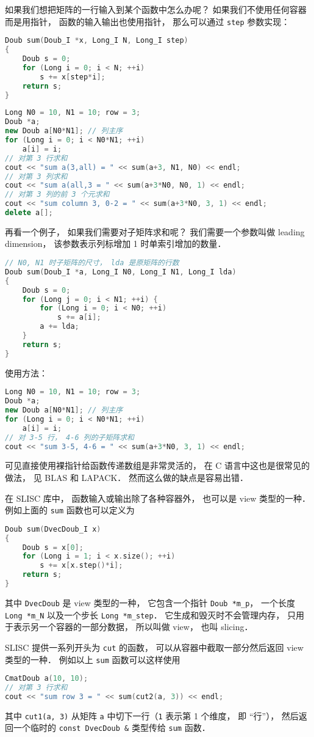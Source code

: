 

如果我们想把矩阵的一行输入到某个函数中怎么办呢？ 如果我们不使用任何容器而是用指针， 函数的输入输出也使用指针， 那么可以通过 \verb|step| 参数实现：
\begin{lstlisting}[language=cpp]
Doub sum(Doub_I *x, Long_I N, Long_I step)
{
    Doub s = 0;
    for (Long i = 0; i < N; ++i)
        s += x[step*i];
    return s;
}
\end{lstlisting}

\begin{lstlisting}[language=cpp]
Long N0 = 10, N1 = 10; row = 3;
Doub *a;
new Doub a[N0*N1]; // 列主序
for (Long i = 0; i < N0*N1; ++i)
    a[i] = i;
// 对第 3 行求和
cout << "sum a(3,all) = " << sum(a+3, N1, N0) << endl;
// 对第 3 列求和
cout << "sum a(all,3 = " << sum(a+3*N0, N0, 1) << endl;
// 对第 3 列的前 3 个元求和
cout << "sum column 3, 0-2 = " << sum(a+3*N0, 3, 1) << endl;
delete a[];
\end{lstlisting}
再看一个例子， 如果我们需要对子矩阵求和呢？ 我们需要一个参数叫做 leading dimension， 该参数表示列标增加 1 时单索引增加的数量．
\begin{lstlisting}[language=cpp]
// N0, N1 时子矩阵的尺寸， lda 是原矩阵的行数
Doub sum(Doub_I *a, Long_I N0, Long_I N1, Long_I lda)
{
    Doub s = 0;
    for (Long j = 0; i < N1; ++i) {
        for (Long i = 0; i < N0; ++i)
            s += a[i];
        a += lda;
    }
    return s;
}
\end{lstlisting}
使用方法：
\begin{lstlisting}[language=cpp]
Long N0 = 10, N1 = 10; row = 3;
Doub *a;
new Doub a[N0*N1]; // 列主序
for (Long i = 0; i < N0*N1; ++i)
    a[i] = i;
// 对 3-5 行， 4-6 列的子矩阵求和
cout << "sum 3-5, 4-6 = " << sum(a+3*N0, 3, 1) << endl;
\end{lstlisting}

可见直接使用裸指针给函数传递数组是非常灵活的， 在 C 语言中这也是很常见的做法， 见 BLAS 和 LAPACK． 然而这么做的缺点是容易出错．

在 SLISC 库中， 函数输入或输出除了各种容器外， 也可以是 view 类型的一种． 例如上面的 \verb|sum| 函数也可以定义为
\begin{lstlisting}[language=cpp]
Doub sum(DvecDoub_I x)
{
    Doub s = x[0];
    for (Long i = 1; i < x.size(); ++i)
        s += x[x.step()*i];
    return s;
}
\end{lstlisting}
其中 \verb|DvecDoub| 是 view 类型的一种， 它包含一个指针 \verb|Doub *m_p|， 一个长度 \verb|Long *m_N| 以及一个步长 \verb|Long *m_step|． 它生成和毁灭时不会管理内存， 只用于表示另一个容器的一部分数据， 所以叫做 view， 也叫 slicing．

SLISC 提供一系列开头为 \verb|cut| 的函数， 可以从容器中截取一部分然后返回 view 类型的一种． 例如以上 \verb|sum| 函数可以这样使用
\begin{lstlisting}[language=cpp]
CmatDoub a(10, 10);
// 对第 3 行求和
cout << "sum row 3 = " << sum(cut2(a, 3)) << endl;
\end{lstlisting}
其中 \verb|cut1(a, 3)| 从矩阵 \verb|a| 中切下一行（\verb|1| 表示第 1 个维度， 即 “行”）， 然后返回一个临时的 \verb|const DvecDoub &| 类型传给 \verb|sum| 函数．
